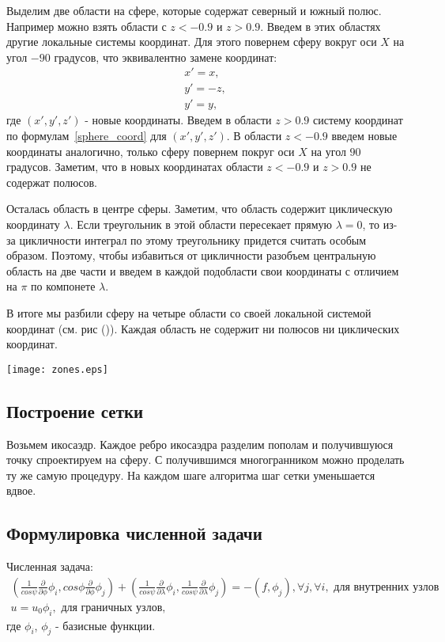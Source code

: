\documentclass[a4paper]{article}
\begin{document}
Выделим две области на сфере, которые содержат северный и южный
полюс. Например можно взять области с $z<-0.9$ и $z>0.9$. Введем в
этих областях другие локальные системы координат. Для этого повернем сферу
вокруг оси $X$ на угол $-90$ градусов, что эквивалентно замене координат:
\begin{equation*}
\begin{split}
x' = x,\\
y' = -z,\\
y' = y,
\end{split}
\end{equation*}
где $(x',y',z')$ - новые координаты. Введем в области $z>0.9$ систему
координат по формулам~\ref{sphere_coord} для $(x',y',z')$.
В области $z<-0.9$ введем новые координаты аналогично, только сферу
повернем покруг оси $X$ на угол $90$ градусов.
Заметим, что в новых координатах области $z<-0.9$ и $z>0.9$ не
содержат полюсов.

Осталась область в центре сферы. Заметим, что область содержит
циклическую координату $\lambda$. Если треугольник в этой области
пересекает прямую $\lambda=0$, то из-за цикличности интеграл по этому
треугольнику придется считать особым образом. Поэтому, чтобы
избавиться от цикличности разобъем центральную область на две части и
введем в каждой подобласти свои координаты с отличием на $\pi$ по
компонете $\lambda$.

В итоге мы разбили сферу на четыре области со своей локальной системой
координат (см. рис ()). Каждая область не содержит ни полюсов ни
циклических координат.

\begin{center}
\texttt{[image: zones.eps]}
\end{center} 

\subsection*{Построение сетки}
Возьмем икосаэдр. Каждое ребро икосаэдра разделим пополам и
получившуюся точку спроектируем на сферу. С получившимся
многогранником можно проделать ту же самую процедуру. На каждом шаге
алгоритма шаг сетки уменьшается вдвое. 

\subsection*{Формулировка численной задачи}
Численная задача:
\begin{equation*}
\begin{split}
(\frac{1}{cos\psi}\frac{\partial}{\partial \phi} \phi_i, cos\phi
  \frac{\partial}{\partial \phi} \phi_j) 
+(\frac{1}{cos\psi}\frac{\partial}{\partial \lambda}\phi_i,
\frac{1}{cos\psi}\frac{\partial}{\partial \lambda}\phi_j ) = -(f,
\phi_j), \forall j, \forall i, \text{ для внутренних узлов } \\ 
u = u_0 \phi_i, \text { для граничных узлов, }
\end{split}
\end{equation*}
где $\phi_i$, $\phi_j$ - базисные функции.
\end{document}
